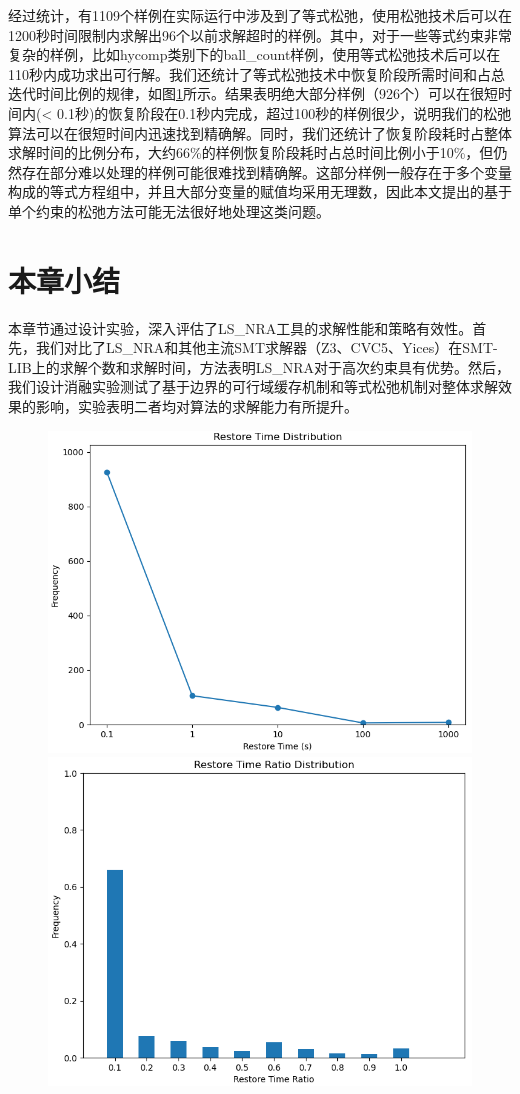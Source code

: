 经过统计，有1109个样例在实际运行中涉及到了等式松弛，使用松弛技术后可以在1200秒时间限制内求解出96个以前求解超时的样例。其中，对于一些等式约束非常复杂的样例，比如hycomp类别下的ball\_count样例，使用等式松弛技术后可以在110秒内成功求出可行解。我们还统计了等式松弛技术中恢复阶段所需时间和占总迭代时间比例的规律，如图\ref{fig:restore2}所示。结果表明绝大部分样例（926个）可以在很短时间内(< 0.1秒)的恢复阶段在0.1秒内完成，超过100秒的样例很少，说明我们的松弛算法可以在很短时间内迅速找到精确解。同时，我们还统计了恢复阶段耗时占整体求解时间的比例分布，大约66\%的样例恢复阶段耗时占总时间比例小于10\%，但仍然存在部分难以处理的样例可能很难找到精确解。这部分样例一般存在于多个变量构成的等式方程组中，并且大部分变量的赋值均采用无理数，因此本文提出的基于单个约束的松弛方法可能无法很好地处理这类问题。

\section{本章小结}
本章节通过设计实验，深入评估了LS\_NRA工具的求解性能和策略有效性。首先，我们对比了LS\_NRA和其他主流SMT求解器（Z3、CVC5、Yices）在SMT-LIB上的求解个数和求解时间，方法表明LS\_NRA对于高次约束具有优势。然后，我们设计消融实验测试了基于边界的可行域缓存机制和等式松弛机制对整体求解效果的影响，实验表明二者均对算法的求解能力有所提升。

\begin{figure}[t]
    \centering
    \includegraphics[width=0.45\columnwidth]{Img/restore_time.png}\qquad
    \includegraphics[width=0.45\columnwidth]{Img/restore_ratio.png}
\label{fig:restore2}
\end{figure}

